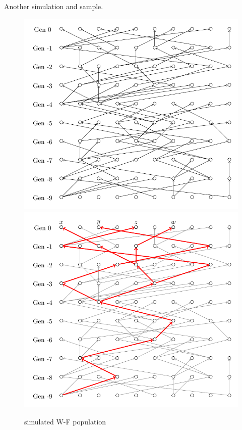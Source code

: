 \documentclass[12pt]{book}
\begin{document}
        Another simulation and sample.
        \begin{figure}[htbp]
            \centering
            \includegraphics[scale = 0.55]{fig/W-F_888.pdf}
            \includegraphics[scale = 0.55]{fig/W-F_888_label.pdf}
            \caption{simulated W-F population}
        \end{figure}
\end{document}
